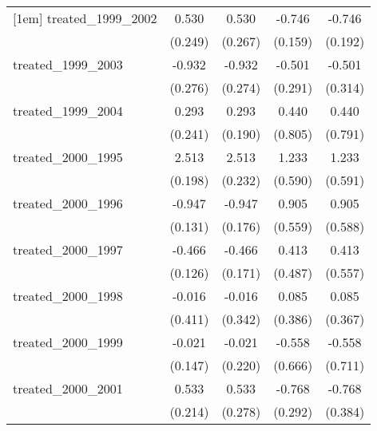 {\begin{tabular}{l*{4}{c}}
[1em]
treated\_1999\_2002&       0.530\sym{*}  &       0.530\sym{*}  &      -0.746\sym{***}&      -0.746\sym{***}\\
            &     (0.249)         &     (0.267)         &     (0.159)         &     (0.192)         \\
[1em]
treated\_1999\_2003&      -0.932\sym{***}&      -0.932\sym{***}&      -0.501         &      -0.501         \\
            &     (0.276)         &     (0.274)         &     (0.291)         &     (0.314)         \\
[1em]
treated\_1999\_2004&       0.293         &       0.293         &       0.440         &       0.440         \\
            &     (0.241)         &     (0.190)         &     (0.805)         &     (0.791)         \\
[1em]
treated\_2000\_1995&       2.513\sym{***}&       2.513\sym{***}&       1.233\sym{*}  &       1.233\sym{*}  \\
            &     (0.198)         &     (0.232)         &     (0.590)         &     (0.591)         \\
[1em]
treated\_2000\_1996&      -0.947\sym{***}&      -0.947\sym{***}&       0.905         &       0.905         \\
            &     (0.131)         &     (0.176)         &     (0.559)         &     (0.588)         \\
[1em]
treated\_2000\_1997&      -0.466\sym{***}&      -0.466\sym{**} &       0.413         &       0.413         \\
            &     (0.126)         &     (0.171)         &     (0.487)         &     (0.557)         \\
[1em]
treated\_2000\_1998&      -0.016         &      -0.016         &       0.085         &       0.085         \\
            &     (0.411)         &     (0.342)         &     (0.386)         &     (0.367)         \\
[1em]
treated\_2000\_1999&      -0.021         &      -0.021         &      -0.558         &      -0.558         \\
            &     (0.147)         &     (0.220)         &     (0.666)         &     (0.711)         \\
[1em]
treated\_2000\_2001&       0.533\sym{*}  &       0.533         &      -0.768\sym{**} &      -0.768\sym{*}  \\
            &     (0.214)         &     (0.278)         &     (0.292)         &     (0.384)         \\

\end{tabular}}
